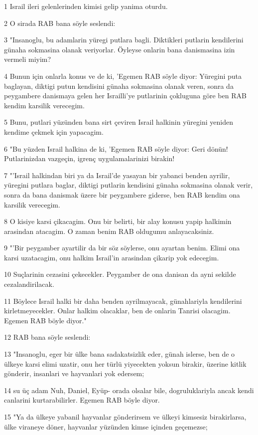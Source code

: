 \par 1 Israil ileri gelenlerinden kimisi gelip yanima oturdu.
\par 2 O sirada RAB bana söyle seslendi:
\par 3 "Insanoglu, bu adamlarin yüregi putlara bagli. Diktikleri putlarin kendilerini günaha sokmasina olanak veriyorlar. Öyleyse onlarin bana danismasina izin vermeli miyim?
\par 4 Bunun için onlarla konus ve de ki, 'Egemen RAB söyle diyor: Yüregini puta baglayan, diktigi putun kendisini günaha sokmasina olanak veren, sonra da peygambere danismaya gelen her Israilli'ye putlarinin çokluguna göre ben RAB kendim karsilik verecegim.
\par 5 Bunu, putlari yüzünden bana sirt çeviren Israil halkinin yüregini yeniden kendime çekmek için yapacagim.
\par 6 "Bu yüzden Israil halkina de ki, 'Egemen RAB söyle diyor: Geri dönün! Putlarinizdan vazgeçin, igrenç uygulamalarinizi birakin!
\par 7 "'Israil halkindan biri ya da Israil'de yasayan bir yabanci benden ayrilir, yüregini putlara baglar, diktigi putlarin kendisini günaha sokmasina olanak verir, sonra da bana danismak üzere bir peygambere giderse, ben RAB kendim ona karsilik verecegim.
\par 8 O kisiye karsi çikacagim. Onu bir belirti, bir alay konusu yapip halkimin arasindan atacagim. O zaman benim RAB oldugumu anlayacaksiniz.
\par 9 "'Bir peygamber ayartilir da bir söz söylerse, onu ayartan benim. Elimi ona karsi uzatacagim, onu halkim Israil'in arasindan çikarip yok edecegim.
\par 10 Suçlarinin cezasini çekecekler. Peygamber de ona danisan da ayni sekilde cezalandirilacak.
\par 11 Böylece Israil halki bir daha benden ayrilmayacak, günahlariyla kendilerini kirletmeyecekler. Onlar halkim olacaklar, ben de onlarin Tanrisi olacagim. Egemen RAB böyle diyor."
\par 12 RAB bana söyle seslendi:
\par 13 "Insanoglu, eger bir ülke bana sadakatsizlik eder, günah islerse, ben de o ülkeye karsi elimi uzatir, onu her türlü yiyecekten yoksun birakir, üzerine kitlik gönderir, insanlari ve hayvanlari yok edersem;
\par 14 su üç adam Nuh, Daniel, Eyüp- orada olsalar bile, dogruluklariyla ancak kendi canlarini kurtarabilirler. Egemen RAB böyle diyor.
\par 15 "Ya da ülkeye yabanil hayvanlar gönderirsem ve ülkeyi kimsesiz birakirlarsa, ülke viraneye döner, hayvanlar yüzünden kimse içinden geçemezse;
